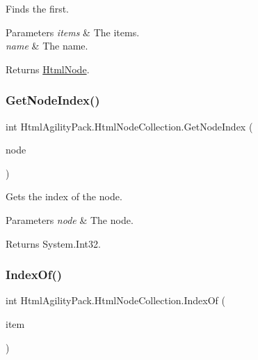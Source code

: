Finds the first. 


\begin{DoxyParams}{Parameters}
{\em items} & The items.\\
\hline
{\em name} & The name.\\
\hline
\end{DoxyParams}
\begin{DoxyReturn}{Returns}
\hyperlink{class_html_agility_pack_1_1_html_node}{Html\+Node}.
\end{DoxyReturn}
\mbox{\label{class_html_agility_pack_1_1_html_node_collection_a7c39a55ada5adcb1226f634406ba6c6a}} 
\subsubsection{\texorpdfstring{Get\+Node\+Index()}{GetNodeIndex()}}
{\footnotesize\ttfamily int Html\+Agility\+Pack.\+Html\+Node\+Collection.\+Get\+Node\+Index (\begin{DoxyParamCaption}\item[{\hyperlink{class_html_agility_pack_1_1_html_node}{Html\+Node}}]{node }\end{DoxyParamCaption})\hspace{0.3cm}{\ttfamily [inline]}}



Gets the index of the node. 


\begin{DoxyParams}{Parameters}
{\em node} & The node.\\
\hline
\end{DoxyParams}
\begin{DoxyReturn}{Returns}
System.\+Int32.
\end{DoxyReturn}
\mbox{\label{class_html_agility_pack_1_1_html_node_collection_ab40a4c24bcd19eccb2b49dcd5da0794e}} 
\subsubsection{\texorpdfstring{Index\+Of()}{IndexOf()}}
{\footnotesize\ttfamily int Html\+Agility\+Pack.\+Html\+Node\+Collection.\+Index\+Of (\begin{DoxyParamCaption}\item[{\hyperlink{class_html_agility_pack_1_1_html_node}{Html\+Node}}]{item }\end{DoxyParamCaption})\hspace{0.3cm}{\ttfamily [inline]}}



